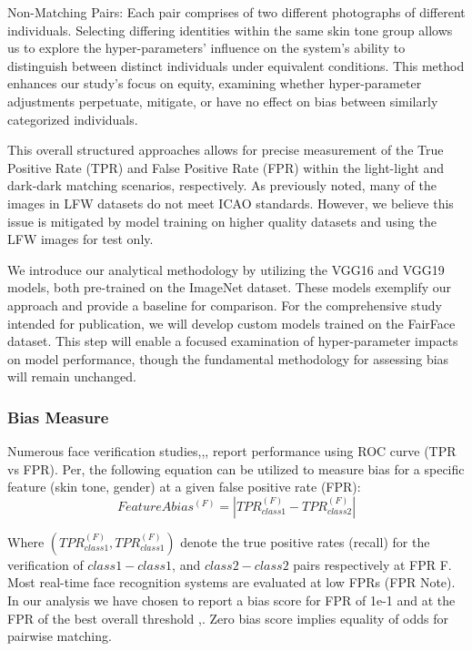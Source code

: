 \documentclass[conference]{IEEEtran}
\begin{document}
Non-Matching Pairs: Each pair comprises of two different photographs of different individuals. Selecting differing identities within the same skin tone group allows us to explore the hyper-parameters' influence on the system’s ability to distinguish between distinct individuals under equivalent conditions. This method enhances our study’s focus on equity, examining whether hyper-parameter adjustments perpetuate, mitigate, or have no effect on bias between similarly categorized individuals.

This overall structured approaches allows for precise measurement of the True Positive Rate (TPR) and False Positive Rate (FPR) within the light-light and dark-dark matching scenarios, respectively. As previously noted, many of the images in LFW datasets do not meet ICAO standards. However, we believe this issue is mitigated by model training on higher quality datasets and using the LFW images for test only.

We introduce our analytical methodology by utilizing the VGG16 and VGG19 models, both pre-trained on the ImageNet\cite{deng2009imagenet} dataset. These models exemplify our approach and provide a baseline for comparison. For the comprehensive study intended for publication, we will develop custom models trained on the FairFace dataset\cite{karkkainen2021fairface}. This step will enable a focused examination of hyper-parameter impacts on model performance, though the fundamental methodology for assessing bias will remain unchanged.

\subsubsection{Bias Measure}
Numerous face verification studies\cite{deng2019arcface},\cite{ranjan2019fast},\cite{liu2017sphereface},\cite{dhar2019measuring} report performance using ROC curve (TPR vs FPR). Per\cite{dhar2022distill},\cite{dhar2021pass} the following equation can be utilized to measure bias for a specific feature (skin tone, gender) at a given false positive rate (FPR):
\begin{equation}
    {Feature A  bias^{(F)}=\left|TPR_{class1}^{(F)} - TPR_{class2}^{(F)}\right|} 
\end{equation}

Where $(TPR_{class1}^{(F)}, TPR_{class1}^{(F)})$ denote the true positive rates (recall) for the verification of $class1-class1$, and $class2-class2$ pairs respectively at FPR F. Most real-time face recognition systems are evaluated at low FPRs (FPR Note). In our analysis we have chosen to report a bias score for FPR of 1e-1 and at the FPR of the best overall threshold \cite{dhar2022distill},\cite{dhar2021pass}. Zero bias score implies equality of odds for pairwise matching.
\end{document}

